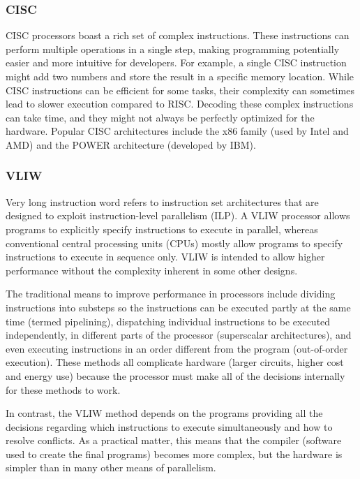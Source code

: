 \documentclass[9pt,a4paper,twoside]{tau}
\begin{document}
        \subsubsection{CISC}
        CISC processors boast a rich set of complex instructions. These instructions can perform multiple operations in a single step, making programming potentially easier and more intuitive for developers. For example, a single CISC instruction might add two numbers and store the result in a specific memory location. While CISC instructions can be efficient for some tasks, their complexity can sometimes lead to slower execution compared to RISC. Decoding these complex instructions can take time, and they might not always be perfectly optimized for the hardware. Popular CISC architectures include the x86 family (used by Intel and AMD) and the POWER architecture (developed by IBM).


        \subsubsection{VLIW}
        Very long instruction word refers to instruction set architectures that are designed to exploit instruction-level parallelism (ILP). A VLIW processor allows programs to explicitly specify instructions to execute in parallel, whereas conventional central processing units (CPUs) mostly allow programs to specify instructions to execute in sequence only. VLIW is intended to allow higher performance without the complexity inherent in some other designs.

        The traditional means to improve performance in processors include dividing instructions into substeps so the instructions can be executed partly at the same time (termed pipelining), dispatching individual instructions to be executed independently, in different parts of the processor (superscalar architectures), and even executing instructions in an order different from the program (out-of-order execution). These methods all complicate hardware (larger circuits, higher cost and energy use) because the processor must make all of the decisions internally for these methods to work.

        In contrast, the VLIW method depends on the programs providing all the decisions regarding which instructions to execute simultaneously and how to resolve conflicts. As a practical matter, this means that the compiler (software used to create the final programs) becomes more complex, but the hardware is simpler than in many other means of parallelism.
\end{document}

